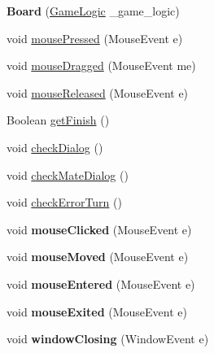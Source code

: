 \begin{DoxyCompactItemize}
\item 
\hypertarget{class_board_a5fa302f692f0cd37377e8eeea570d599}{{\bfseries Board} (\hyperlink{class_game_logic}{Game\-Logic} \-\_\-game\-\_\-logic)}\label{class_board_a5fa302f692f0cd37377e8eeea570d599}

\item 
void \hyperlink{class_board_a37b7c03eacc3aec9ba48533ab3838f11}{mouse\-Pressed} (Mouse\-Event e)
\item 
void \hyperlink{class_board_ad2aee45964de8e92562032c36d7643c9}{mouse\-Dragged} (Mouse\-Event me)
\item 
void \hyperlink{class_board_abd7848e4044ed956d3b7f207f6d99ef9}{mouse\-Released} (Mouse\-Event e)
\item 
Boolean \hyperlink{class_board_a499318c478aea617ffe42f6e002f74ef}{get\-Finish} ()
\item 
void \hyperlink{class_board_a522a240b57c601ac68dae4e02022ca56}{check\-Dialog} ()
\item 
void \hyperlink{class_board_aceec202d7656676418e88bb0ac2d122d}{check\-Mate\-Dialog} ()
\item 
void \hyperlink{class_board_a0949e66b93c73ea67065a3b7c5e1bcae}{check\-Error\-Turn} ()
\item 
\hypertarget{class_board_a5bcac6239ccaccd32267bdd7045d89d7}{void {\bfseries mouse\-Clicked} (Mouse\-Event e)}\label{class_board_a5bcac6239ccaccd32267bdd7045d89d7}

\item 
\hypertarget{class_board_a683e962b3ce5f3dcdcdecf5ddddb0cbf}{void {\bfseries mouse\-Moved} (Mouse\-Event e)}\label{class_board_a683e962b3ce5f3dcdcdecf5ddddb0cbf}

\item 
\hypertarget{class_board_af0a6c48adfbfda0decef55ea852af326}{void {\bfseries mouse\-Entered} (Mouse\-Event e)}\label{class_board_af0a6c48adfbfda0decef55ea852af326}

\item 
\hypertarget{class_board_a0750ca283683f18505df7cd31653b62c}{void {\bfseries mouse\-Exited} (Mouse\-Event e)}\label{class_board_a0750ca283683f18505df7cd31653b62c}

\item 
\hypertarget{class_board_abed7b49b7504f432dd0f39e2e72714d2}{void {\bfseries window\-Closing} (Window\-Event e)}\label{class_board_abed7b49b7504f432dd0f39e2e72714d2}

\end{DoxyCompactItemize}


